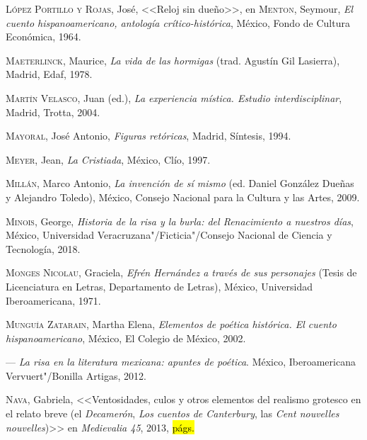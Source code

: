 \documentclass[14pt,twoside,final]{extbook} %
\begin{document}
\textsc{López Portillo y Rojas}, José, <<Reloj sin dueño>>, en \textsc{Menton}, Seymour, \emph{El cuento hispanoamericano, antología crítico-histórica}, México, Fondo de Cultura Económica, 1964.\label{bib:lopezportillo1964}

\textsc{Maeterlinck}, Maurice, \emph{La vida de las hormigas} (trad. Agustín Gil Lasierra), Madrid, Edaf, 1978.\label{bib:maeterlinck1978}

\textsc{Martín Velasco}, Juan (ed.), \emph{La experiencia mística. Estudio interdisciplinar}, Madrid, Trotta, 2004.\label{bib:martin2004}

\textsc{Mayoral}, José Antonio, \emph{Figuras retóricas}, Madrid, Síntesis, 1994.\label{bib:mayoral1994}

\textsc{Meyer}, Jean, \emph{La Cristiada}, México, Clío, 1997.\label{bib:meyer1997}

\textsc{Millán}, Marco Antonio, \emph{La invención de sí mismo} (ed. Daniel González Dueñas y Alejandro Toledo), México, Consejo Nacional para la Cultura y las Artes, 2009.\label{bib:millan2009}

\textsc{Minois}, George, \emph{Historia de la risa y la burla: del Renacimiento a nuestros días}, México, Universidad Veracruzana"/Ficticia"/Consejo Nacional de Ciencia y Tecnología, 2018.\label{bib:minois2018}

\textsc{Monges Nicolau}, Graciela, \emph{Efrén Hernández a través de sus personajes} (Tesis de Licenciatura en Letras, Departamento de Letras), México, Universidad Iberoamericana, 1971.\label{bib:monges1971}

\textsc{Munguía Zatarain}, Martha Elena, \emph{Elementos de poética histórica. El cuento hispanoamericano}, México, El Colegio de México, 2002.\label{bib:munguia2002}

--- \emph{La risa en la literatura mexicana: apuntes de poética}. México, Iberoamericana Vervuert"/Bonilla Artigas, 2012.\label{bib:munguia2012}

\textsc{Nava}, Gabriela, <<Ventosidades, culos y otros elementos del realismo grotesco en el relato breve (el \emph{Decamerón}, \emph{Los cuentos de Canterbury}, las \emph{Cent nouvelles nouvelles})>> en \emph{Medievalia 45}, 2013, \hl{págs.}\label{bib:nava2013}
\end{document}
